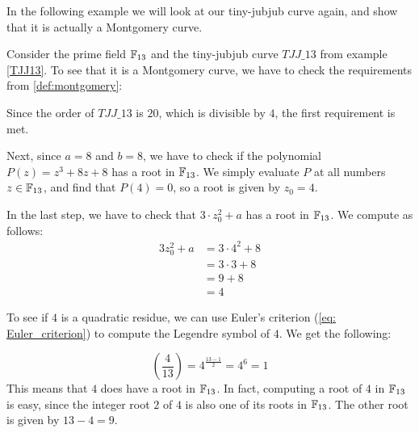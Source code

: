 In the following example we will look at our tiny-jubjub curve again, and show that it is actually a Montgomery curve.
\begin{example}\label{TJJ13-montgomery}
Consider the prime field $\mathbb{F}_{13}$ and the tiny-jubjub curve $\mathit{TJJ\_13}$ from example \ref{TJJ13}. To see that it is a Montgomery curve, we have to check the requirements from \ref{def:montgomery}: 

Since the order  of $\mathit{TJJ\_13}$ is $20$, which is divisible by $4$, the first requirement is met. 

Next, since $a=8$ and $b=8$, we have to check if the polynomial $P(z) = z^3 + 8z + 8$ has a root in $\mathbb{F}_{13}$. We simply evaluate $P$ at all numbers $z\in \mathbb{F}_{13}$, and find that $P(4)=0$, so a root is given by $z_0=4$.

In the last step, we have to check that $3\cdot z_0^2 + a$ has a root in $\mathbb{F}_{13}$. We compute as follows:
\begin{align*}
3z_0^2 + a & = 3\cdot 4^2 + 8 \\
           & = 3 \cdot 3 + 8 \\
           & = 9 + 8 \\
           & = 4
\end{align*}

To see if $4$ is a quadratic residue, we can use Euler's criterion (\ref{eq: Euler_criterion}) to compute the Legendre symbol of $4$. We get the following:

$$
\left(\frac{4}{13}\right) = 4^{\frac{13-1}{2}} = 4^6 = 1
$$ 
This means that $4$ does have a root in $\mathbb{F}_{13}$. In fact, computing a root of $4$ in $\mathbb{F}_{13}$ is easy, since the integer root $2$ of $4$ is also one of its roots in $\mathbb{F}_{13}$. The other root is given by $13-4=9$.


\end{example}
